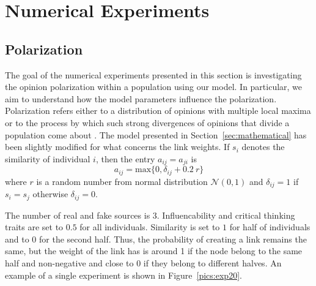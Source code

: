 \section{Numerical Experiments}


\subsection{Polarization}

The goal of the numerical experiments presented in this section is investigating the opinion polarization within a population using our model. In particular, we aim to understand how the model parameters influence the polarization. 
Polarization refers either to a distribution of opinions with multiple local maxima or to the process by which such strong divergences of opinions that divide a population come about \cite{Banisch2019}\cite{Bramsona2016}. The model presented in Section~\ref{sec:mathematical} has been slightly modified for what concerns the link weights. If $s_i$ denotes the similarity of individual $i$, then the entry $a_{ij} = a_{ji}$ is 
\begin{equation}
a_{ij} = \text{max}\{0, \delta_{ij} + 0.2\ r\}
\end{equation}
where $r$ is a random number from normal distribution $\mathcal{N}(0,1)$ and $\delta_{ij} = 1$ if $s_i = s_j$ otherwise $\delta_{ij} = 0$. 

The number of real and fake sources is 3. Influencability and critical thinking traits are set to $0.5$ for all individuals. Similarity is set to $1$ for half of individuals and to $0$ for the second half. Thus, the probability of creating a link remains the same, but the weight of the link has is around 1 if the node belong to the same half and non-negative and close to 0 if they belong to different halves. An example of a single experiment is shown in Figure~\ref{pics:exp20}.\\

